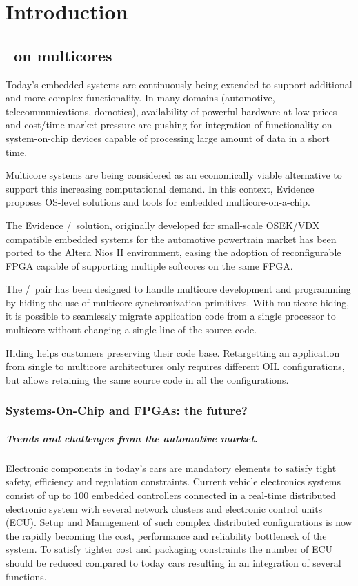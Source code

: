 \chapter[Introduction]{Introduction}
\label{cha:introduction}


\section{\ee\ on multicores}

Today's embedded systems are continuously being extended to support
additional and more complex functionality. In many domains
(automotive, telecommunications, domotics), availability of powerful
hardware at low prices and cost/time market pressure are pushing for
integration of functionality on system-on-chip devices capable of
processing large amount of data in a short time.

Multicore systems are being considered as an economically viable
alternative to support this increasing computational demand. In this
context, Evidence proposes OS-level solutions and tools for embedded
multicore-on-a-chip.

The Evidence \rtd/\ee\ solution, originally developed for small-scale
OSEK/VDX compatible embedded systems for the automotive powertrain
market has been ported to the Altera Nios II environment, easing the
adoption of reconfigurable FPGA capable of supporting multiple
softcores on the same FPGA.

The \rtd/\ee\ pair has been designed to handle multicore
development and programming by hiding the use of multicore
synchronization primitives. With multicore hiding, it is
possible to seamlessly migrate application code from a single
processor to multicore without changing a single line of the
source code.

Hiding helps customers preserving their code base. Retargetting an
application from single to multicore architectures only requires
different OIL configurations, but allows retaining the same source
code in all the configurations.




\subsection{Systems-On-Chip and FPGAs: the future?}

\paragraph{Trends and challenges from the automotive market.}
Electronic components in today's cars are mandatory elements to
satisfy tight safety, efficiency and regulation constraints. Current
vehicle electronics systems consist of up to 100 embedded controllers
connected in a real-time distributed electronic system with several
network clusters and electronic control units (ECU). Setup and
Management of such complex distributed configurations is now the
rapidly becoming the cost, performance and reliability bottleneck of
the system. To satisfy tighter cost and packaging constraints the
number of ECU should be reduced compared to today cars resulting in an
integration of several functions.

